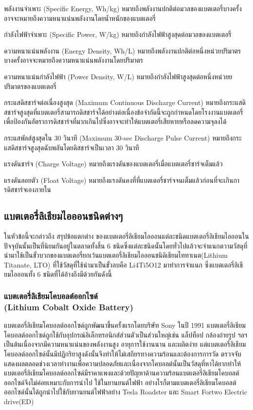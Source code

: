 \begin{itemize}
	{\item
		พลังงานจำเพาะ (Specific Energy, Wh/kg) หมายถึงพลังงานปกติต่อมวลของแบตเตอรี่บางครั้งอาจจะหมายถึงความหนาแน่นพลังงานโดยน้ำหนักของแบตเตอรี่}
	{\item
		กำลังไฟฟ้าจำเพาะ (Specific Power, W/kg) หมายถึงกำลังไฟฟ้าสูงสุดต่อมวลของแบตเตอรี่}
	{\item
		ความหนาแน่นพลังงาน (Energy Density, Wh/L) หมายถึงพลังงานปกติต่อหนึ่งหน่วยปริมาตรบางครั้งอาจจะหมายถึงความหนาแน่นพลังงานโดยปริมาตร}
	{\item
		ความหนาแน่นกำลังไฟฟ้า (Power Density, W/L) หมายถึงกำลังไฟฟ้าสูงสุดต่อหนึ่งหน่วยยปริมาตรของแบตเตอรี่}
	{\item
		กระแสดิสชาร์จต่อเนื่องสูงสุด (Maximum Continuous Discharge Current) หมายถึงกระแสดิสชาร์จสูงสุดที่แบตเตอรี่สามารถดิสชาร์จได้อย่างต่อเนื่องข้อจำกัดนี้จะถูกกำหนดโดยโรงงานแบตเตอรี่เพื่อป้องกันอัตราการดิสชาร์จที่มากเกินไปซึ่งอาจจะทำให้แบตเตอรี่เสียหายหรือลดความจุลงได้}
	{\item
		กระแสพัลส์สูงสุดใน 30 วินาที (Maximum 30-sec Discharge Pulse Current) หมายถึงกระแสดิสชาร์จสูงสุดฉับพลันโดยดิสชาร์จเป็นเวลา 30 วินาที}
	{\item
		แรงดันชาร์จ (Charge Voltage) หมายถึงแรงดันของแบตเตอรี่เมื่อแบตเตอรี่ชาร์จเต็มแล้ว}
	{\item
		แรงดันลอยตัว (Float Voltage) หมายถึงแรงดันคงที่ที่แบตเตอรี่ชาร์จจนเต็มแล้วก่อนที่จะเกินการดิสชาร์จเองภายใน}
\end{itemize}
\subsection{แบตเตอรี่ลิเธียมไอออนชนิดต่างๆ}
	ในหัวข้อนี้จะกล่าวถึง สรุปข้อแตกต่าง ของแบตเตอรี่ลิเธียมไอออนแต่ละชนิดแบตเตอรี่ลิเธียมไอออนในปัจจุบันนั้นเป็นที่นิยมกันอยู่ในตลาดทั้งสิ้น 6 ชนิดซึ่งแต่ละชนิดนั้นโดยทั่วไปแล้วจะจำแนกตวามวัสดุที่นำมาใช้เป็นขั้วบวกของแบตเตอรี่ยกเว้นแบตเตอรี่ลิเธียมไอออนชนิดิเธียมไททาเนต(Lithium Titanate, LTO) ที่ใช้วัสดุที่ใช้นำมาเป็นขั้วลบคือ Li4Ti5O12 มาทำการจำแนก ซึ่งแบตเตอรี่ลิเธียมไอออนทั้ง 6 ชนิดที่ได้อ้างถึงมีด้วยกันดังนี้ 
\subsubsection*{แบตเตอรี่ลิเธียมโคบอลต์ออกไซด์\\ (Lithium Cobalt Oxide Battery)}
	แบตเตอรี่ลิเธียมโคบอลต์ออกไซด์ถูกพัฒนาขึ้นครั้งแรกโดยบริษัท Sony ในปี 1991 แบตเตอรี่ลิเธียมโคบอลต์ออกไซด์ถูกใช้กับอุปกรณ์อิเล็กทรอนิกส์ส่วนตัวเป็นส่วนใหญ่เช่น แล็ปท็อป กล้องถ่ายรูป ฯลฯ เป็นต้นเนื่องจากมีความหนาแน่นของพลังงานสูง อายุการใช้งานนาน และผลิตง่าย แต่แบตเตอรี่ลิเธียมโคบอลต์ออกไซด์นั้นมีปฏิกริยาสูงดังนั้นจึงทำให้ไม่เสถียรทางความร้อนและต้องการการวัด ตรวจจับ แสดงผลตลอดช่วงเวลาทำงานเพื่อความปลอดภัยและเนื่องจากโคบอลต์นั้นเป็นวัสดุที่หาได้ยากทำให้แบตเตอรี่ลิเธียมโคบอลต์ออกไซด์มีราคาแพงและด้วยปัญหาด้านความร้อนแบตเตอรี่ลิเธียมโคบอลต์ออกไซด์จึงไม่ค่อยเหมาะกับการนำไป
ใช้ในยานยนต์ไฟฟ้า
\newline อย่างไรก็ตามแบตเตอรี่ลิเธียมโคบอลต์ออกไซด์นั้นได้ถูกนำไปใช้กับยานยนต์ไฟฟ้าอย่าง Tesla Roadster และ Smart Fortwo Electric drive(ED)
